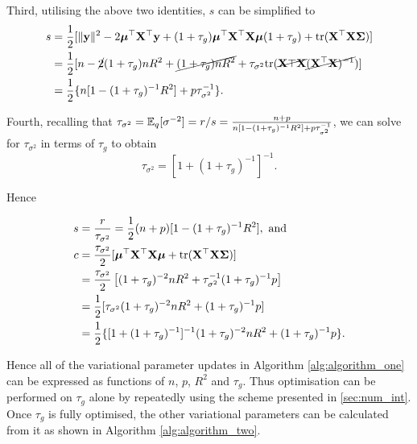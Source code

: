 \documentclass{amsart}[12pt]
\begin{document}
Third, utilising the above two identities, $s$ can be simplified to
\begin{align*}
	s & = \frac{1}{2} [\|{\bf y}\|^2 - 2 {\boldsymbol \mu}^\top {\bf X}^\top {\bf y} + (1 + \tau_g) {\boldsymbol \mu}^\top {\bf X}^\top {\bf X} {\boldsymbol\mu} (1 + \tau_g) +  \text{tr} ({\bf X}^\top {\bf X} {\boldsymbol\Sigma})]                 \\
	  & = \frac{1}{2} [n - \cancel{2} (1 + \tau_g) n R ^2 + \cancel{(1 + \tau_g) n R^2} + \tau_{\sigma^2} \text{tr} (\cancel{{\bf X}\top {\bf X}} \cancel{({\bf X}^\top {\bf X})^{-1}})] \\
	  & = \frac{1}{2} \{ n[1 - (1 + \tau_g)^{-1} R^2] + p \tau_{\sigma^2}^{-1} \}.                                                                                 
\end{align*}

Fourth, recalling that $\tau_{\sigma^2} = \mathbb{E}_q [\sigma^{-2}] = r/s = \frac{n+p}{n[1 - (1 + \tau_g)^{-1} R^2] + p \tau_{\sigma^2}^{-1}}$, we can solve for $\tau_{\sigma^2}$ in terms of $\tau_g$ to obtain
\[
	\tau_{\sigma^2} = [1 + (1 + \tau_g)^{-1}]^{-1}.
\]

Hence

\begin{align*}
	s & = \frac{r}{\tau_{\sigma^2}} = \frac{1}{2} (n + p) [1 - (1 + \tau_g)^{-1} R^2], \text{ and }                \\
	c & = \frac{\tau_{\sigma^2}}{2}[{\boldsymbol \mu}^\top {\bf X}^\top {\bf X} {\boldsymbol\mu} + \text{tr} ({\bf X}^\top {\bf X} {\boldsymbol\Sigma})]                      \\
	  & = \frac{\tau_{\sigma^2}}{2}\left[(1 + \tau_g)^{-2} n R^2 + \tau_{\sigma^2}^{-1} (1 + \tau_g)^{-1} p\right] \\
	  & = \frac{1}{2} [ \tau_{\sigma^2} (1 + \tau_g)^{-2} n R^2 + (1 + \tau_g)^{-1} p]                             \\
	  & = \frac{1}{2} \{ [1 + (1 + \tau_g)^{-1}]^{-1} (1 + \tau_g)^{-2} n R^2 + (1 + \tau_g)^{-1} p\}.             
\end{align*}

\noindent Hence all of the variational parameter updates in Algorithm \ref{alg:algorithm_one} can be expressed as functions
of $n$, $p$, $R^2$ and $\tau_g$. Thus optimisation can be performed on $\tau_g$ alone by repeatedly using the
scheme presented in \ref{sec:num_int}. Once $\tau_g$ is fully optimised, the other variational parameters can
be calculated from it as shown in Algorithm \ref{alg:algorithm_two}.
\end{document}
